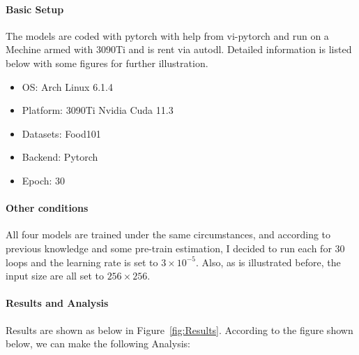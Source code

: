 \paragraph{Basic Setup} The models are coded with pytorch with help from vi-pytorch\cite{lucidrainsvitpytorch} and run on a Mechine armed with 3090Ti and is rent via autodl\cite{autodl}. Detailed information is listed below with some figures for further illustration.
\begin{itemize}
  \item OS: Arch Linux 6.1.4
  \item Platform: 3090Ti Nvidia Cuda 11.3
  \item Datasets: Food101\cite{bossard2014food}
  \item Backend: Pytorch
  \item Epoch: 30
\end{itemize}


\paragraph{Other conditions} All four models are trained under the same circumstances, and according to previous knowledge and some pre-train estimation, I decided to run each for 30 loops and the learning rate is set to $3\times 10^{-5}$. Also, as is illustrated before, the input size are all set to $256\times 256$.

\paragraph{Results and Analysis} Results are shown as below in Figure~\ref{fig:Results}.
According to the figure shown below, we can make the following Analysis:

